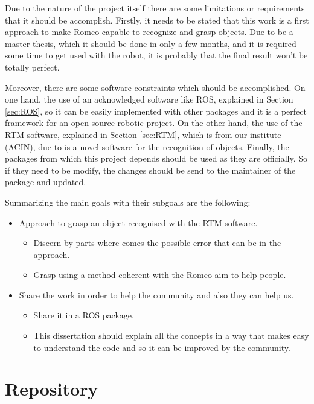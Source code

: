 \documentclass[12pt,a4paper,final,twoside,openright]{report}
\begin{document}
Due to the nature of the project itself there are some limitations or requirements that it should be accomplish. Firstly, it needs to be stated that this work is a first approach to make Romeo capable to recognize and grasp objects. Due to be a master thesis, which it should be done in only a few months, and it is required some time to get used with the robot, it is probably that the final result won't be totally perfect.

Moreover, there are some software constraints which should be accomplished. On one hand, the use of an acknowledged software like ROS, explained in Section \ref{sec:ROS}, so it can be easily implemented with other packages and it is a perfect framework for an open-source robotic project. On the other hand, the use of the RTM software, explained in Section \ref{sec:RTM}, which is from our institute (ACIN), due to is a novel software for the recognition of objects. Finally, the packages from which this project depends should be used as they are officially. So if they need to be modify, the changes should be send to the maintainer of the package and updated.

Summarizing the main goals with their subgoals are the following:
\begin{itemize}
\item Approach to grasp an object recognised with the RTM software.
\begin{itemize}
\item Discern by parts where comes the possible error that can be in the approach.
\item Grasp using a method coherent with the Romeo aim to help people.
\end{itemize}
\item Share the work in order to help the community and also they can help us.
\begin{itemize}
\item Share it in a ROS package.
\item This dissertation should explain all the concepts in a way that makes easy to understand the code and so it can be improved by the community.
\end{itemize}
\end{itemize}

\vspace{-10pt}
\section{Repository}
\label{sec:repository}
\end{document}
